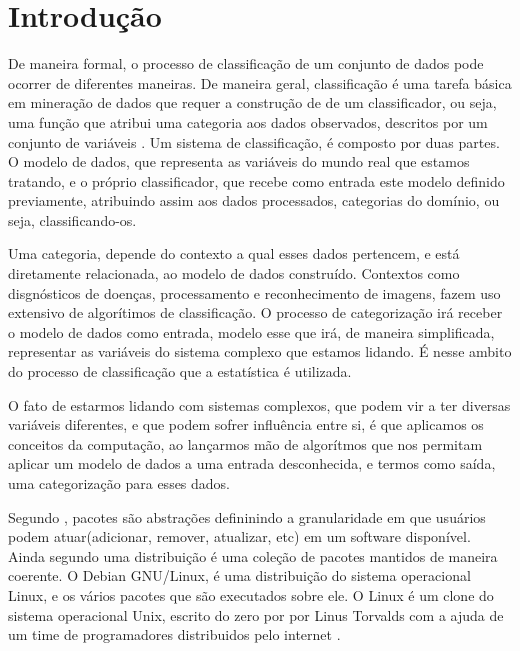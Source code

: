 \chapter*[Introdução]{Introdução}

De maneira formal, o processo de classificação de um conjunto de dados pode ocorrer de diferentes maneiras. De maneira geral, classificação é uma tarefa básica em mineração de dados que requer a construção de de um classificador, ou seja, uma função que atribui uma categoria aos dados observados, descritos por um conjunto de variáveis \cite{Taheri}. Um sistema de classificação, é composto por duas partes. O modelo de dados, que representa as variáveis do mundo real que estamos tratando, e o próprio classificador, que recebe como entrada este modelo definido previamente, atribuindo assim aos dados processados, categorias do domínio, ou seja, classificando-os.

 Uma categoria, depende do contexto a qual esses dados pertencem, e está diretamente relacionada, ao modelo de dados construído. Contextos como disgnósticos de doenças, processamento e reconhecimento de imagens, fazem uso extensivo de algorítimos de classificação. O processo de categorização irá receber o modelo de dados como entrada, modelo esse que irá, de maneira simplificada, representar as variáveis do sistema complexo que estamos lidando. É nesse ambito do processo de classificação que a estatística é utilizada. 
 
 O fato de estarmos lidando com sistemas complexos, que podem vir a ter diversas variáveis diferentes, e que podem sofrer influência entre si, é que aplicamos os conceitos da computação, ao lançarmos mão de algorítmos que nos permitam aplicar um modelo de dados a uma entrada desconhecida, e termos como saída, uma categorização para esses dados. 



Segundo \cite{Zacchiroli}, pacotes são abstrações defininindo a granularidade em que usuários podem atuar(adicionar, remover, atualizar, etc) em um software disponível. Ainda
segundo \cite{Zacchiroli} uma distribuição é uma coleção de pacotes mantidos de maneira coerente.
O Debian GNU/Linux, é uma distribuição do sistema operacional Linux, e os vários pacotes que são executados sobre ele\cite{Debian}.
O Linux é um clone do sistema operacional Unix, escrito do zero por por Linus Torvalds com a ajuda de um time de programadores distribuidos pelo internet \cite{Linux}.


